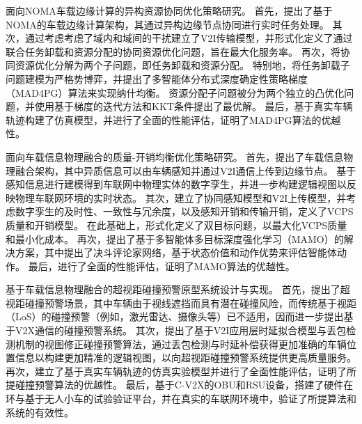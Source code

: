 \begin{cabstract}
 面向NOMA车载边缘计算的异构资源协同优化策略研究。
首先，提出了基于NOMA的车载边缘计算架构，其通过异构边缘节点协同进行实时任务处理。
其次，通过考虑考虑了域内和域间的干扰建立了V2I传输模型，并形式化定义了通过联合任务卸载和资源分配的协同资源优化问题，旨在最大化服务率。
再次，将协同资源优化分解为两个子问题，即任务卸载和资源分配。
特别地，将任务卸载子问题建模为严格势博弈，并提出了多智能体分布式深度确定性策略梯度（MAD4PG）算法来实现纳什均衡。
资源分配子问题被分为两个独立的凸优化问题，并使用基于梯度的迭代方法和KKT条件提出了最优解。
最后，基于真实车辆轨迹构建了仿真模型，并进行了全面的性能评估，证明了MAD4PG算法的优越性。

 面向车载信息物理融合的质量-开销均衡优化策略研究。
首先，提出了车载信息物理融合架构，其中异质信息可以由车辆感知并通过V2I通信上传到边缘节点。
基于感知信息进行建模得到车联网中物理实体的数字孪生，并进一步构建逻辑视图以反映物理车联网环境的实时状态。
其次，建立了协同感知模型和V2I上传模型，并考虑数字孪生的及时性、一致性与冗余度，以及感知开销和传输开销，定义了VCPS质量和开销模型。
在此基础上，形式化定义了双目标问题，以最大化VCPS质量和最小化成本。
再次，提出了基于多智能体多目标深度强化学习（MAMO）的解决方案，其中提出了决斗评论家网络，基于状态价值和动作优势来评估智能体动作。
最后，进行了全面的性能评估，证明了MAMO算法的优越性。

 基于车载信息物理融合的超视距碰撞预警原型系统设计与实现。
首先，提出了超视距碰撞预警场景，其中车辆由于视线遮挡而具有潜在碰撞风险，而传统基于视距（LoS）的碰撞预警（例如，激光雷达、摄像头等）已不适用，因而进一步提出基于V2X通信的碰撞预警系统。
其次，提出了基于V2I应用层时延拟合模型与丢包检测机制的视图修正碰撞预警算法，通过丢包检测与时延补偿获得更加准确的车辆位置信息以构建更加精准的逻辑视图，以向超视距碰撞预警系统提供更高质量服务。
再次，建立了基于真实车辆轨迹的仿真实验模型并进行了全面性能评估，证明了所提碰撞预警算法的优越性。
最后，基于C-V2X的OBU和RSU设备，搭建了硬件在环与基于无人小车的试验验证平台，并在真实的车联网环境中，验证了所提算法和系统的有效性。

\end{cabstract}

